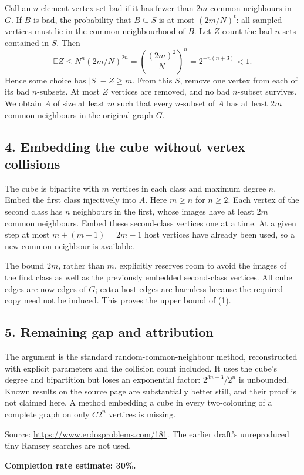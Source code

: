 Call an $n$-element vertex set bad if it has fewer than $2m$ common neighbours in $G$. If $B$ is bad, the probability that $B\subseteq S$ is at most $(2m/N)^t$: all sampled vertices must lie in the common neighbourhood of $B$. Let $Z$ count the bad $n$-sets contained in $S$. Then
\[
 \mathbb EZ\le N^n(2m/N)^{2n}
 =\left(\frac{(2m)^2}{N}\right)^n
 =2^{-n(n+3)}<1.\tag{3}
\]
Hence some choice has $|S|-Z\ge m$. From this $S$, remove one vertex from each of its bad $n$-subsets. At most $Z$ vertices are removed, and no bad $n$-subset survives. We obtain $A$ of size at least $m$ such that every $n$-subset of $A$ has at least $2m$ common neighbours in the original graph $G$.

\subsection*{4. Embedding the cube without vertex collisions}
The cube is bipartite with $m$ vertices in each class and maximum degree $n$. Embed the first class injectively into $A$. Here $m\ge n$ for $n\ge2$. Each vertex of the second class has $n$ neighbours in the first, whose images have at least $2m$ common neighbours. Embed these second-class vertices one at a time. At a given step at most $m+(m-1)=2m-1$ host vertices have already been used, so a new common neighbour is available.

The bound $2m$, rather than $m$, explicitly reserves room to avoid the images of the first class as well as the previously embedded second-class vertices. All cube edges are now edges of $G$; extra host edges are harmless because the required copy need not be induced. This proves the upper bound of (1).

\subsection*{5. Remaining gap and attribution}
The argument is the standard random-common-neighbour method, reconstructed with explicit parameters and the collision count included. It uses the cube's degree and bipartition but loses an exponential factor: $2^{3n+3}/2^n$ is unbounded. Known results on the source page are substantially better still, and their proof is not claimed here. A method embedding a cube in every two-colouring of a complete graph on only $C2^n$ vertices is missing.

Source: \url{https://www.erdosproblems.com/181}. The earlier draft's unreproduced tiny Ramsey searches are not used.

\textbf{Completion rate estimate: 30\%.}

